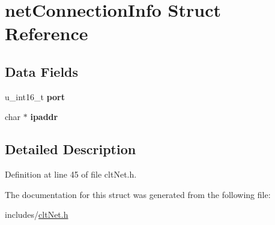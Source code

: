 \hypertarget{structnet_connection_info}{}\section{net\+Connection\+Info Struct Reference}
\label{structnet_connection_info}
\subsection*{Data Fields}
\begin{DoxyCompactItemize}
\item 
\mbox{\label{structnet_connection_info_a9e26a4afe91a21810290057677a17a11}} 
u\+\_\+int16\+\_\+t {\bfseries port}
\item 
\mbox{\label{structnet_connection_info_ad540706412769097e113feb208f0b6bf}} 
char $\ast$ {\bfseries ipaddr}
\end{DoxyCompactItemize}


\subsection{Detailed Description}


Definition at line 45 of file clt\+Net.\+h.



The documentation for this struct was generated from the following file\+:\begin{DoxyCompactItemize}
\item 
includes/\hyperlink{clt_net_8h}{clt\+Net.\+h}\end{DoxyCompactItemize}
